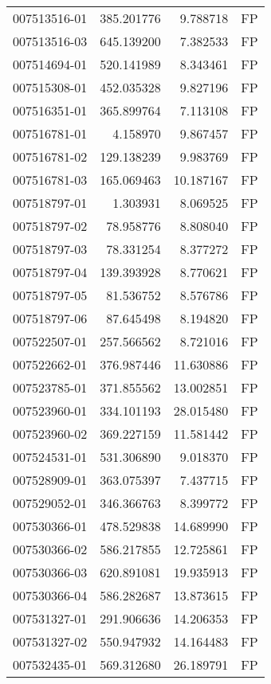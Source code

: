 \begin{tabular}{lrrl}
007513516-01 &  385.201776 &     9.788718 &   FP \\
007513516-03 &  645.139200 &     7.382533 &   FP \\
007514694-01 &  520.141989 &     8.343461 &   FP \\
007515308-01 &  452.035328 &     9.827196 &   FP \\
007516351-01 &  365.899764 &     7.113108 &   FP \\
007516781-01 &    4.158970 &     9.867457 &   FP \\
007516781-02 &  129.138239 &     9.983769 &   FP \\
007516781-03 &  165.069463 &    10.187167 &   FP \\
007518797-01 &    1.303931 &     8.069525 &   FP \\
007518797-02 &   78.958776 &     8.808040 &   FP \\
007518797-03 &   78.331254 &     8.377272 &   FP \\
007518797-04 &  139.393928 &     8.770621 &   FP \\
007518797-05 &   81.536752 &     8.576786 &   FP \\
007518797-06 &   87.645498 &     8.194820 &   FP \\
007522507-01 &  257.566562 &     8.721016 &   FP \\
007522662-01 &  376.987446 &    11.630886 &   FP \\
007523785-01 &  371.855562 &    13.002851 &   FP \\
007523960-01 &  334.101193 &    28.015480 &   FP \\
007523960-02 &  369.227159 &    11.581442 &   FP \\
007524531-01 &  531.306890 &     9.018370 &   FP \\
007528909-01 &  363.075397 &     7.437715 &   FP \\
007529052-01 &  346.366763 &     8.399772 &   FP \\
007530366-01 &  478.529838 &    14.689990 &   FP \\
007530366-02 &  586.217855 &    12.725861 &   FP \\
007530366-03 &  620.891081 &    19.935913 &   FP \\
007530366-04 &  586.282687 &    13.873615 &   FP \\
007531327-01 &  291.906636 &    14.206353 &   FP \\
007531327-02 &  550.947932 &    14.164483 &   FP \\
007532435-01 &  569.312680 &    26.189791 &   FP \\

\end{tabular}

